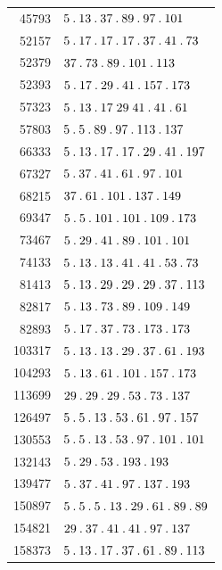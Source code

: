 %
\begingroup\small\setlength{\tabcolsep}{5pt}
\begin{longtable}{@{}r|l@{}}
45793 & $5\pdot 13\pdot 37\pdot 89\pdot 97\pdot 101$\\
52157 & $5\pdot 17\pdot 17\pdot 17\pdot 37\pdot 41\pdot 73$\\
52379 & $37\pdot 73\pdot 89\pdot 101\pdot 113$\\
52393 & $5\pdot 17\pdot 29\pdot 41\pdot 157\pdot 173$\\
57323 & $5\pdot 13\pdot 17\;29\;41\pdot 41\pdot 61$\\
57803 & $5\pdot 5\pdot 89\pdot 97\pdot 113\pdot 137$\\
66333 & $5\pdot 13\pdot 17\pdot 17\pdot 29\pdot 41\pdot 197$\\
67327 & $5\pdot 37\pdot 41\pdot 61\pdot 97\pdot 101$\\
68215 & $37\pdot 61\pdot 101\pdot 137\pdot 149$\\
69347 & $5\pdot 5\pdot 101\pdot 101\pdot 109\pdot 173$\\
73467 & $5\pdot 29\pdot 41\pdot 89\pdot 101\pdot 101$\\
74133 & $5\pdot 13\pdot 13\pdot 41\pdot 41\pdot 53\pdot 73$\\
81413 & $5\pdot 13\pdot 29\pdot 29\pdot 29\pdot 37\pdot 113$\\
82817 & $5\pdot 13\pdot 73\pdot 89\pdot 109\pdot 149$\\
82893 & $5\pdot 17\pdot 37\pdot 73\pdot 173\pdot 173$\\
103317 & $5\pdot 13\pdot 13\pdot 29\pdot 37\pdot 61\pdot 193$\\
104293 & $5\pdot 13\pdot 61\pdot 101\pdot 157\pdot 173$\\
113699 & $29\pdot 29\pdot 29\pdot 53\pdot 73\pdot 137$\\
126497 & $5\pdot 5\pdot 13\pdot 53\pdot 61\pdot 97\pdot 157$\\
130553 & $5\pdot 5\pdot 13\pdot 53\pdot 97\pdot 101\pdot 101$\\
132143 & $5\pdot 29\pdot 53\pdot 193\pdot 193$\\
139477 & $5\pdot 37\pdot 41\pdot 97\pdot 137\pdot 193$\\
150897 & $5\pdot 5\pdot 5\pdot 13\pdot 29\pdot 61\pdot 89\pdot 89$\\
154821 & $29\pdot 37\pdot 41\pdot 41\pdot 97\pdot 137$\\
158373 & $5\pdot 13\pdot 17\pdot 37\pdot 61\pdot 89\pdot 113$\\

\end{longtable}
